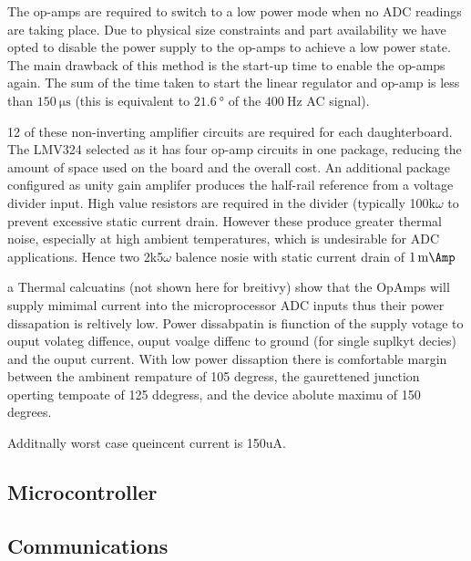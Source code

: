 \documentclass[12pt]{article}
\begin{document}
The op-amps are required to switch to a low power mode when no ADC readings are taking place.
Due to physical size constraints and part availability we have opted to disable the power supply to the op-amps to achieve a low power state.
The main drawback of this method is the start-up time to enable the op-amps again.
The sum of the time taken to start the linear regulator and op-amp is less than $\SI{150}{\micro\second}$ (this is equivalent to $\SI{21.6}{\degree}$ of the $\SI{400}{\hertz}$ AC signal).

12 of these non-inverting amplifier circuits are required for each daughterboard.
The LMV324 selected as it has four op-amp circuits in one package, reducing the amount of space used on the board and the overall cost.
An additional package configured as unity gain amplifer produces the half-rail reference from a voltage divider input.
High value resistors are required in the divider (typically 100k$\omega$ to prevent excessive static current drain.
However these produce greater thermal noise, especially at high ambient temperatures, which is undesirable for ADC applications. Hence two 2k5$\omega$ balence nosie with 
static current drain of $\SI{1}{\milli\Amp}$

a 
Thermal calcuatins (not shown here for breitivy) show that the OpAmps will supply mimimal current into the microprocessor ADC inputs thus their power dissapation is reltively low.
Power dissabpatin is fiunction of the supply votage to ouput volateg diffence, ouput voalge diffenc to ground (for single suplkyt decies) and the ouput current.
With low power dissaption there is comfortable margin between the ambinent rempature of 105 degress, the gaurettened junction operting tempoate of 125 ddegress, and the device abolute maximu of 150 degrees.

Additnally worst case queincent current is 150uA.

\subsection{Microcontroller}




\subsection{Communications}
\end{document}
